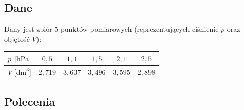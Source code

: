 \documentclass[a4paper,11pt]{article}
\begin{document}
\subsection*{Dane}

Dany jest zbiór 5 punktów pomiarowych (reprezentujących ciśnienie $p$ oraz objętość $V$):

\begin{center}
\begin{tabular}{c|ccccc}
  \toprule
  $p$ [$\text{hPa}$] & $0{,}5$ & $1{,}1$ & $1{,}5$ & $2{,}1$ & $2{,}5$ \\
  \midrule
  $V$ [$\text{dm}^3$] & $2{,}719$ & $3{,}637$ & $3{,}496$ & $3{,}595$ & $2{,}898$ \\
  \bottomrule
\end{tabular}
\end{center}

\subsection*{Polecenia}
\end{document}
